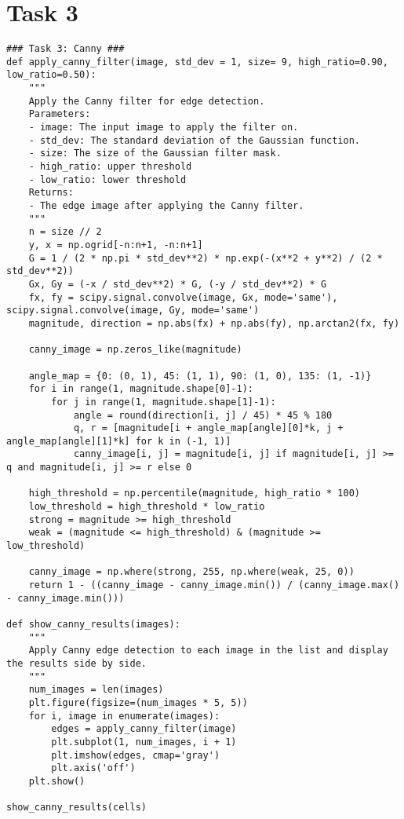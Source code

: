 \documentclass[11pt]{article}
\begin{document}
\section*{Task 3}

\begin{lstlisting}
### Task 3: Canny ###
def apply_canny_filter(image, std_dev = 1, size= 9, high_ratio=0.90, low_ratio=0.50):
    """
    Apply the Canny filter for edge detection.
    Parameters:
    - image: The input image to apply the filter on.
    - std_dev: The standard deviation of the Gaussian function.
    - size: The size of the Gaussian filter mask.
    - high_ratio: upper threshold
    - low_ratio: lower threshold
    Returns:
    - The edge image after applying the Canny filter.
    """
    n = size // 2
    y, x = np.ogrid[-n:n+1, -n:n+1]
    G = 1 / (2 * np.pi * std_dev**2) * np.exp(-(x**2 + y**2) / (2 * std_dev**2))
    Gx, Gy = (-x / std_dev**2) * G, (-y / std_dev**2) * G
    fx, fy = scipy.signal.convolve(image, Gx, mode='same'), scipy.signal.convolve(image, Gy, mode='same')
    magnitude, direction = np.abs(fx) + np.abs(fy), np.arctan2(fx, fy)
    
    canny_image = np.zeros_like(magnitude)
    
    angle_map = {0: (0, 1), 45: (1, 1), 90: (1, 0), 135: (1, -1)}
    for i in range(1, magnitude.shape[0]-1):
        for j in range(1, magnitude.shape[1]-1):
            angle = round(direction[i, j] / 45) * 45 % 180
            q, r = [magnitude[i + angle_map[angle][0]*k, j + angle_map[angle][1]*k] for k in (-1, 1)]
            canny_image[i, j] = magnitude[i, j] if magnitude[i, j] >= q and magnitude[i, j] >= r else 0
    
    high_threshold = np.percentile(magnitude, high_ratio * 100)
    low_threshold = high_threshold * low_ratio
    strong = magnitude >= high_threshold
    weak = (magnitude <= high_threshold) & (magnitude >= low_threshold)
    
    canny_image = np.where(strong, 255, np.where(weak, 25, 0))
    return 1 - ((canny_image - canny_image.min()) / (canny_image.max() - canny_image.min()))

def show_canny_results(images):
    """
    Apply Canny edge detection to each image in the list and display the results side by side.
    """
    num_images = len(images)
    plt.figure(figsize=(num_images * 5, 5))
    for i, image in enumerate(images):
        edges = apply_canny_filter(image)
        plt.subplot(1, num_images, i + 1)
        plt.imshow(edges, cmap='gray')
        plt.axis('off')
    plt.show()

show_canny_results(cells)
\end{lstlisting}
\end{document}
